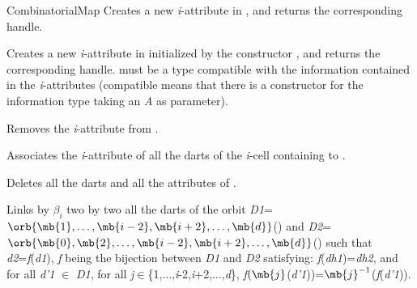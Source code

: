\begin{ccRefConcept}{CombinatorialMap}
{Creates a new \emph{i}-attribute in , and returns the corresponding handle.
  }
	
{Creates a new \emph{i}-attribute in  initialized 
  by the constructor , and returns the corresponding handle.  must be 
  a type compatible with the information contained in the \emph{i}-attributes 
  (compatible means that there is a constructor for the information type 
  taking an \emph{A} as parameter).
  }

{Removes the \emph{i}-attribute  from .
  }

   {Associates the \emph{i}-attribute of all the darts of the \emph{i}-cell 
     containing  to .
  }

   {Deletes all the darts and all the attributes of .}
\ccOperations

 {Links by $\beta_i$
  two by two all the darts of the orbit
  \emph{D1}=$\orb{\mb{1},\ldots,\mb{i-2},\mb{i+2},\ldots,\mb{d}}$() and
  \emph{D2}=$\orb{\mb{0},\mb{2},\ldots,\mb{i-2},\mb{i+2},\ldots,\mb{d}}$()
  such that \emph{d2}=\emph{f}(\emph{d1}), \emph{f} being the bijection between \emph{D1} and \emph{D2} 
  satisfying: \emph{f}(\emph{dh1})=\emph{dh2}, and for all \emph{d'1} $\in$ \emph{D1}, for all \emph{j}$\in
  $\{1,$\ldots$,\emph{i}-2,\emph{i}+2,$\ldots$,\emph{d}\},
  \emph{f}$(\mb{j}$(\emph{d'1}))=$\mb{j}^{-1}$(\emph{f}(\emph{d'1})).

}
\end{ccRefConcept}

